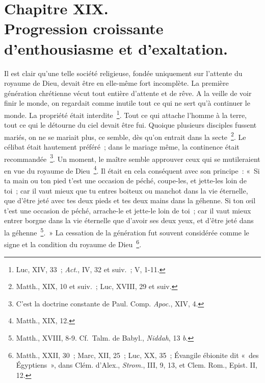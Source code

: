 \documentclass[french,twoside]{book} %
\newcommand\chapteropen{} %
\newcommand\chaptercont{} %
\newcommand\chapterclose{} %
\begin{document}
\chapterclose


\chapteropen
\chapter[{Chapitre XIX. Progression croissante d’enthousiasme et d’exaltation.}]{Chapitre XIX.\\
Progression croissante d’enthousiasme et d’exaltation.}\renewcommand{\leftmark}{Chapitre XIX.\\
Progression croissante d’enthousiasme et d’exaltation.}


\chaptercont
\noindent Il est clair qu’une telle société religieuse, fondée uniquement sur l’attente du royaume de Dieu, devait être en elle-même fort incomplète. La première génération chrétienne vécut tout entière d’attente et de rêve. A la veille de voir finir le monde, on regardait comme inutile tout ce qui ne sert qu’à continuer le monde. La propriété était interdite \footnote{ Luc, XIV, 33 ; {\itshape Act.}, IV, 32 et suiv. ; V, 1-11.}. Tout ce qui attache l’homme à la terre, tout ce qui le détourne du ciel devait être fui. Quoique plusieurs disciples fussent mariés, on ne se mariait plus, ce semble, dès qu’on entrait dans la secte \footnote{Matth., XIX, 10 et suiv. ; Luc, XVIII, 29 et suiv.}. Le célibat était hautement préféré ; dans le mariage même, la continence était recommandée \footnote{ C’est la doctrine constante de Paul. Comp. {\itshape Apoc.}, XIV, 4.}. Un moment, le maître semble approuver ceux qui se mutileraient en vue du royaume de Dieu \footnote{Matth., XIX, 12.}. Il était en cela conséquent avec son principe : « Si ta main ou ton pied t’est une occasion de péché, coupe-les, et jette-les loin de toi ; car il vaut mieux que tu entres boiteux ou manchot dans la vie éternelle, que d’être jeté avec tes deux pieds et tes deux mains dans la géhenne. Si ton œil t’est une occasion de péché, arrache-le et jette-le loin de toi ; car il vaut mieux entrer borgne dans la vie éternelle que d’avoir ses deux yeux, et d’être jeté dans la géhenne \footnote{ Matth., XVIII, 8-9. Cf. Talm. de Babyl., {\itshape Niddah}, 13 {\itshape b}.}. » La cessation de la génération fut souvent considérée comme le signe et la condition du royaume de Dieu \footnote{ Matth., XXII, 30 ; Marc, XII, 25 ; Luc, XX, 35 ; Évangile ébionite dit « des Égyptiens », dans Clém. d’Alex., {\itshape Strom.}, III, 9, 13, et Clem. Rom., Epist. II, 12.}.\par
\end{document}
